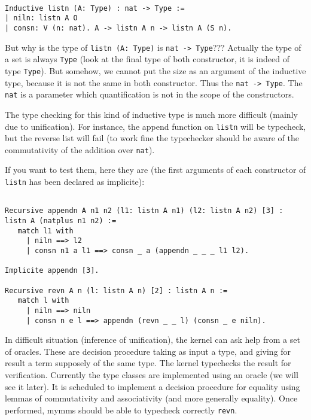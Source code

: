 \documentclass[a4paper,5pt,onecolumn]{article}
\begin{document}
\begin{verbatim}

Inductive listn (A: Type) : nat -> Type :=
| niln: listn A O
| consn: V (n: nat). A -> listn A n -> listn A (S n).

\end{verbatim}

But why is the type of \texttt{listn (A: Type)} is \texttt{nat ->
  Type}??? Actually the type of a set is always \texttt{Type} (look at
the final type of both constructor, it is indeed of type
\texttt{Type}). But somehow, we cannot put the size as an argument of
the inductive type, because it is not the same in both
constructor. Thus the \texttt{nat -> Type}. The \texttt{nat} is a
parameter which quantification is not in the scope of the
constructors.

The type checking for this kind of inductive type is much more
difficult (mainly due to unification). For instance, the append
function on \texttt{listn} will be typecheck, but the reverse list
will fail (to work fine the typechecker should be aware of the
commutativity of the addition over \texttt{nat}). 

If you want to test them, here they are (the first arguments of each
constructor of \texttt{listn} has been declared as implicite):

\begin{verbatim}

Recursive appendn A n1 n2 (l1: listn A n1) (l2: listn A n2) [3] : listn A (natplus n1 n2) :=
   match l1 with
     | niln ==> l2
     | consn n1 a l1 ==> consn _ a (appendn _ _ _ l1 l2).

Implicite appendn [3].

Recursive revn A n (l: listn A n) [2] : listn A n :=
   match l with
     | niln ==> niln
     | consn n e l ==> appendn (revn _ _ l) (consn _ e niln).

\end{verbatim}

In difficult situation (inference of unification), the kernel can ask
help from a set of oracles. These are decision procedure taking as
input a type, and giving for result a term supposely of the same
type. The kernel typechecks the result for verification. Currently the
type classes are implemented using an oracle (we will see it
later). It is scheduled to implement a decision procedure for equality
using lemmas of commutativity and associativity (and more generally
equality). Once performed, mymms should be able to typecheck correctly
\texttt{revn}.
\end{document}
